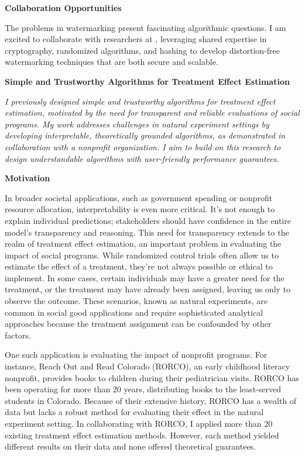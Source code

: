 \documentclass[11pt]{article}
\begin{document}
{{ \large \textbf{Collaboration Opportunities}}

The problems in watermarking present fascinating algorithmic questions. I am excited to collaborate with researchers at \school, leveraging shared expertise in cryptography, randomized algorithms, and hashing to develop distortion-free watermarking techniques that are both secure and scalable.

\begin{center}
    { \large \textbf{Simple and Trustworthy Algorithms for Treatment Effect Estimation}}    
\end{center}

\textit{I previously designed simple and trustworthy algorithms for treatment effect estimation, motivated by the need for transparent and reliable evaluations of social programs. My work addresses challenges in natural experiment settings by developing interpretable, theoretically grounded algorithms, as demonstrated in collaboration with a nonprofit organization. I aim to build on this research to design understandable algorithms with user-friendly performance guarantees.}

{ \large \textbf{Motivation}}

In broader societal applications, such as government spending or nonprofit resource allocation, interpretability is even more critical. It's not enough to explain individual predictions; stakeholders should have confidence in the entire model's transparency and reasoning. This need for transparency extends to the realm of treatment effect estimation, an important problem in evaluating the impact of social programs. While randomized control trials often allow us to estimate the effect of a treatment, they're not always possible or ethical to implement. In some cases, certain individuals may have a greater need for the treatment, or the treatment may have already been assigned, leaving us only to observe the outcome. These scenarios, known as natural experiments, are common in social good applications and require sophisticated analytical approaches because the treatment assignment can be confounded by other factors.

One such application is evaluating the impact of nonprofit programs. For instance, Reach Out and Read Colorado (RORCO), an early childhood literacy nonprofit, provides books to children during their pediatrician visits. RORCO has been operating for more than 20 years, distributing books to the least-served students in Colorado. Because of their extensive history, RORCO has a wealth of data but lacks a robust method for evaluating their effect in the natural experiment setting. In collaborating with RORCO, I applied more than 20 existing treatment effect estimation methods. However, each method yielded different results on their data and none offered theoretical guarantees.

}
\end{document}
